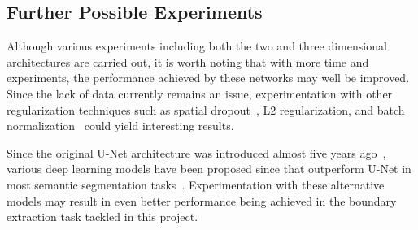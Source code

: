 \subsection{Further Possible Experiments}

Although various experiments including both the two and three dimensional architectures are carried out, it is worth noting that with more time and experiments, the performance achieved by these networks may well be improved. Since the lack of data currently remains an issue, experimentation with other regularization techniques such as spatial dropout~\cite{spatial}, L2 regularization, and batch normalization~\cite{batchnorm} could yield interesting results.

Since the original U-Net architecture was introduced almost five years ago~\cite{ronneberger2015u}, various deep learning models have been proposed since that outperform U-Net in most semantic segmentation tasks~\cite{chen2018encoder, semanticseg-SOTA}. Experimentation with these alternative models may result in even better performance being achieved in the boundary extraction task tackled in this project.





